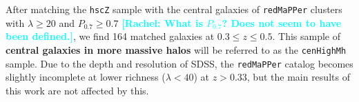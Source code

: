 \documentclass[a4paper,fleqn,usenatbib]{mnras}
\def\arcsec{{\prime\prime}}
\def\redm{\texttt{redMaPPer}}
\def\rbcg{\texttt{cenHighMh}}
\def\mhalo{{$M_{\mathrm{halo}}$}}
\def\logms{{$\log (M_{\star}/M_{\odot})$}}
\def\logmh{{$\log (M_{\mathrm{halo}}/M_{\odot})$}}
\newcommand{\rachel}[1]{\textcolor{cyan}{\textbf{[Rachel: #1]}}}
\begin{document}

    
    

 
    After matching the \texttt{hscZ} sample with the central galaxies of \redm{} 
    clusters with $\lambda \geq 20$ and $P_{\mathrm{0.7}} \geq 0.7$ \rachel{What is $P_{\mathrm{0.7}}$?  Does not seem to have been defined.}, we find 164 
    matched galaxies at $0.3 \leq z \leq 0.5$.
    This sample of \textbf{central galaxies in more massive halos} will be referred to 
    as the \rbcg{} sample. 
    Due to the depth and resolution of SDSS, the \redm{} catalog becomes slightly 
    incomplete at lower richness ($\lambda < 40$) at $z > 0.33$, but the main results 
    of this work are not affected by this.
    
\end{document}
